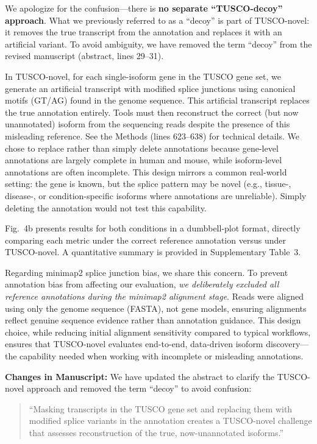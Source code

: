 \documentclass[11pt]{article}
\begin{document}
\begin{responseboxnew}
We apologize for the confusion---there is \textbf{no separate ``TUSCO-decoy'' approach}. What we previously referred to as a ``decoy'' is part of TUSCO-novel: it removes the true transcript from the annotation and replaces it with an artificial variant. To avoid ambiguity, we have removed the term ``decoy'' from the revised manuscript (abstract, lines 29--31).

In TUSCO-novel, for each single-isoform gene in the TUSCO gene set, we generate an artificial transcript with modified splice junctions using canonical motifs (GT/AG) found in the genome sequence. This artificial transcript replaces the true annotation entirely. Tools must then reconstruct the correct (but now unannotated) isoform from the sequencing reads despite the presence of this misleading reference. See the Methods (lines 623--638) for technical details. We chose to replace rather than simply delete annotations because gene-level annotations are largely complete in human and mouse, while isoform-level annotations are often incomplete. This design mirrors a common real-world setting: the gene is known, but the splice pattern may be novel (e.g., tissue-, disease-, or condition-specific isoforms where annotations are unreliable). Simply deleting the annotation would not test this capability.

Fig.~4b presents results for both conditions in a dumbbell-plot format, directly comparing each metric under the correct reference annotation versus under TUSCO-novel. A quantitative summary is provided in Supplementary Table~3.

Regarding minimap2 splice junction bias, we share this concern. To prevent annotation bias from affecting our evaluation, \textit{we deliberately excluded all reference annotations during the minimap2 alignment stage}. Reads were aligned using only the genome sequence (FASTA), not gene models, ensuring alignments reflect genuine sequence evidence rather than annotation guidance. This design choice, while reducing initial alignment sensitivity compared to typical workflows, ensures that TUSCO-novel evaluates end-to-end, data-driven isoform discovery---the capability needed when working with incomplete or misleading annotations.

\vspace{0.3cm}
\textbf{Changes in Manuscript:} We have updated the abstract to clarify the TUSCO-novel approach and removed the term ``decoy'' to avoid confusion:
\begin{quote}
``Masking transcripts in the TUSCO gene set and replacing them with modified splice variants in the annotation creates a TUSCO-novel challenge that assesses reconstruction of the true, now-unannotated isoforms.''
\end{quote}
\end{responseboxnew}
\end{document}
